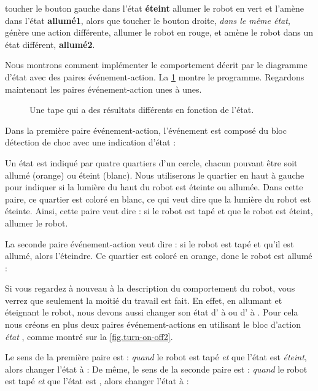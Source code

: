 toucher le bouton gauche dans l'état \textbf{éteint} allumer le robot en vert et l'amène dans l'état \textbf{allumé1}, alors que toucher le bouton droite, \emph{dans le même état}, génère une action différente, allumer le robot en rouge, et amène le robot dans un état différent, \textbf{allumé2}.


Nous montrons comment implémenter le comportement décrit par le diagramme d'état avec des paires événement-action.
La \cref{fig.turn-on-off} montre le programme.
Regardons maintenant les paires événement-action unes à unes.

\begin{figure}
	\hfill
	\caption{Une tape qui a des résultats différents en fonction de l'état.}
	\label{fig.turn-on-off}
\end{figure}

Dans la première paire événement-action, l'événement est composé du bloc détection de choc avec une indication d'état : 

Un état est indiqué par quatre quartiers d'un cercle, chacun pouvant être soit allumé (orange) ou éteint (blanc).
Nous utiliserons le quartier en haut à gauche pour indiquer si la lumière du haut du robot est éteinte ou allumée.
Dans cette paire, ce quartier est coloré en blanc, ce qui veut dire que la lumière du robot est éteinte.
Ainsi, cette paire veut dire : si le robot est tapé et que le robot est éteint, allumer le robot.

La seconde paire événement-action veut dire : si le robot est tapé et qu'il est allumé, alors l'éteindre.
Ce quartier est coloré en orange, donc le robot est allumé : 

Si vous regardez à nouveau à la description du comportement du robot, vous verrez que seulement la moitié du travail est fait.
En effet, en allumant et éteignant le robot, nous devons aussi changer son état d' à  ou d' à .
Pour cela nous créons en plus deux paires événement-actions en utilisant le bloc d'action \emph{état} , comme montré sur la \cref{fig.turn-on-off2}.

Le sens de la première paire est : \emph{quand} le robot est tapé \emph{et} que l'état est \emph{éteint}, alors changer l'état à  : 
De même, le sens de la seconde paire est : \emph{quand} le robot est tapé \emph{et} que l'état est , alors changer l'état à  : 

